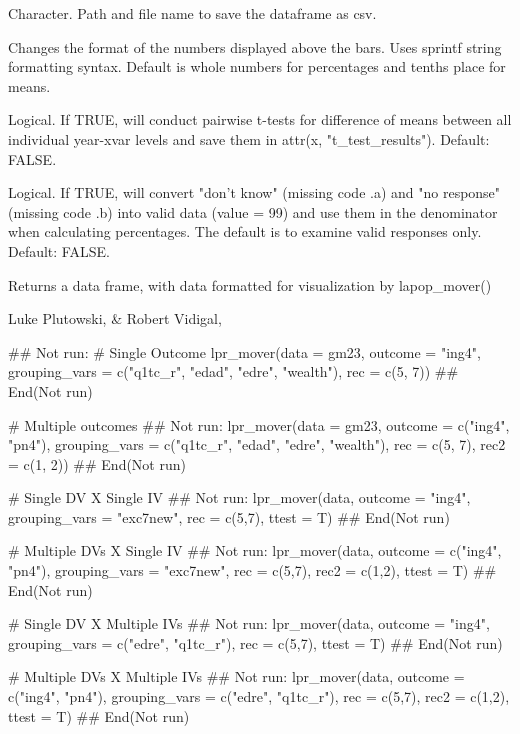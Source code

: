 \documentclass[a4paper]{book}
\begin{document}
\begin{Arguments}
\begin{ldescription}
\item[\code{filesave}] Character.  Path and file name to save the dataframe as csv.

\item[\code{cfmt}] Changes the format of the numbers displayed above the bars.
Uses sprintf string formatting syntax. Default is whole numbers for percentages
and tenths place for means.

\item[\code{ttest}] Logical.  If TRUE, will conduct pairwise t-tests for difference
of means between all individual year-xvar levels and save them in attr(x,
"t\_test\_results"). Default: FALSE.

\item[\code{keep\_nr}] Logical.  If TRUE, will convert "don't know" (missing code .a)
and "no response" (missing code .b) into valid data (value = 99) and use them
in the denominator when calculating percentages.  The default is to examine
valid responses only.  Default: FALSE.
\end{ldescription}
\end{Arguments}
%
\begin{Value}
Returns a data frame, with data formatted for visualization by lapop\_mover()
\end{Value}
%
\begin{Author}
Luke Plutowski,  \& Robert Vidigal, 
\end{Author}
%
\begin{Examples}
\begin{ExampleCode}
## Not run: 
# Single Outcome
lpr_mover(data = gm23,
 outcome = "ing4",
 grouping_vars = c("q1tc_r", "edad", "edre", "wealth"),
 rec = c(5, 7))
## End(Not run)

 # Multiple outcomes
 ## Not run: 
 lpr_mover(data = gm23,
 outcome = c("ing4", "pn4"),
 grouping_vars = c("q1tc_r", "edad", "edre", "wealth"),
 rec = c(5, 7),
 rec2 = c(1, 2))
## End(Not run)

# Single DV X Single IV
## Not run: 
lpr_mover(data,
outcome = "ing4",
grouping_vars = "exc7new",
rec = c(5,7), ttest = T)
## End(Not run)

# Multiple DVs X Single IV
## Not run: 
lpr_mover(data,
outcome = c("ing4", "pn4"),
grouping_vars = "exc7new",
rec = c(5,7), rec2 = c(1,2), ttest = T)
## End(Not run)

# Single DV X Multiple IVs
## Not run: 
lpr_mover(data,
outcome = "ing4",
grouping_vars = c("edre", "q1tc_r"),
rec = c(5,7), ttest = T)
## End(Not run)

# Multiple DVs X Multiple IVs
## Not run: 
lpr_mover(data,
outcome = c("ing4", "pn4"),
grouping_vars = c("edre", "q1tc_r"),
rec = c(5,7), rec2 = c(1,2), ttest = T)
## End(Not run)
\end{ExampleCode}
\end{Examples}
\end{document}
